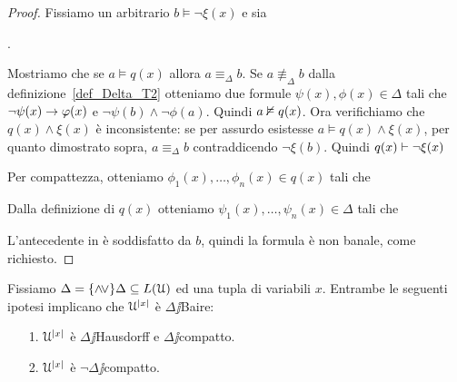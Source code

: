 \begin{proof}
Fissiamo un arbitrario $b\models\neg\xi(x)$ e sia 

. 

Mostriamo che se $a\models q(x)$ allora $a\equiv_\Delta b$. Se $a\nequiv_\Delta b$ dalla definizione~\ref{def_Delta_T2} otteniamo due formule $\psi(x),\phi(x)\in\Delta$ tali che $\neg\psi(x)\rightarrow\varphi(x)$ e $\neg\psi(b)\wedge\neg\phi(a)$. Quindi $a\nvDash q(x)$. Ora verifichiamo che $q(x)\wedge\xi(x)$ \`e inconsistente: se per assurdo esistesse $a\models q(x)\wedge\xi(x)$, per quanto dimostrato sopra, $a\equiv_\Delta b$ contraddicendo $\neg\xi(b)$. Quindi $q(x) \vdash \neg\xi(x)$ 

Per compattezza, otteniamo $\phi_1(x),\dots,\phi_n(x)\in q(x)$ tali che


Dalla definizione di $q(x)$ otteniamo $\psi_1(x),\dots,\psi_n(x)\in\Delta$ tali che 


L'antecedente in  \`e soddisfatto da $b$, quindi la formula  \`e non banale, come richiesto.
\end{proof}



\begin{theorem}\label{thm_cat_baire} Fissiamo $\Delta=\{\wedge\!\vee\}\Delta\subseteq L(\EuScript U)$ ed una tupla di variabili $x$. Entrambe le seguenti ipotesi implicano che $\EuScript U^{|x|}$ \`e $\Delta\jj$Baire:
\begin{itemize}
\item[1.]  $\EuScript U^{|x|}$ \`e $\Delta\jj$Hausdorff e $\Delta\jj$compatto.
\item[2.]  $\EuScript U^{|x|}$ \`e $\neg\!\Delta\jj$compatto.
\end{itemize}
\end{theorem}

